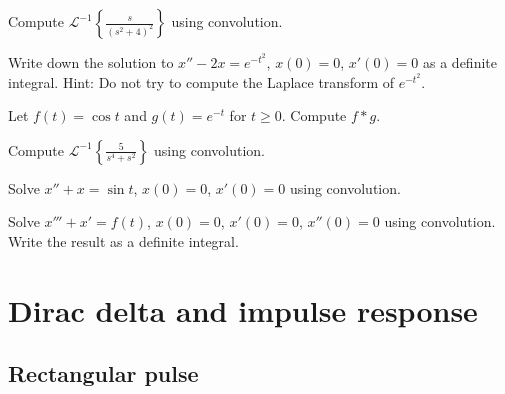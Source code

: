 \begin{exercise}
Compute ${\mathcal{L}}^{-1} \left\{ \frac{s}{{(s^2+4)}^2} \right\}$ using
convolution.
\end{exercise}

\begin{exercise}
Write down the solution to
$x''-2x=e^{-t^2}$, $x(0)=0$, $x'(0)=0$ as a
definite integral.  Hint: Do not try to compute the
Laplace transform of $e^{-t^2}$.
\end{exercise}

\setcounter{exercise}{100}

\begin{exercise}
Let $f(t) = \cos t$ and $g(t) = e^{-t}$ for $t \geq 0$.  Compute
$f * g$.
\end{exercise}

\begin{exercise}
Compute ${\mathcal{L}}^{-1} \left\{ \frac{5}{s^4+s^2} \right\}$ using
convolution.
\end{exercise}

\begin{exercise}
Solve $x''+x = \sin t$, $x(0) = 0$, $x'(0)=0$ using convolution.
\end{exercise}

\begin{exercise}
Solve $x'''+x' = f(t)$, $x(0) = 0$, $x'(0)=0$, $x''(0)=0$ using convolution.
Write the result as a definite integral.
\end{exercise}


\sectionnewpage
\section{Dirac delta and impulse response}
\label{diracdelta:section}



\subsection{Rectangular pulse}

